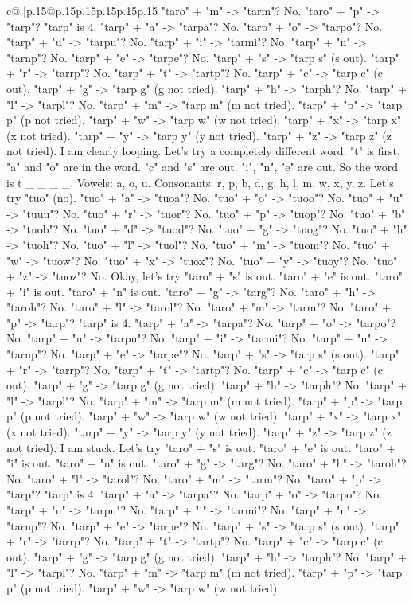 \documentclass{article}
\begin{document}
{\begin{supertabular}{c@{$\;$}|p{.15\linewidth}@{}p{.15\linewidth}p{.15\linewidth}p{.15\linewidth}p{.15\linewidth}p{.15\linewidth}}
{{{"taro" + "m" {-}> "tarm"? No. "taro" + "p" {-}> "tarp"? "tarp" is 4. "tarp" + "a" {-}> "tarpa"? No. "tarp" + "o" {-}> "tarpo"? No. "tarp" + "u" {-}> "tarpu"? No. "tarp" + "i" {-}> "tarmi"? No. "tarp" + "n" {-}> "tarnp"? No. "tarp" + "e" {-}> "tarpe"? No. "tarp" + "s" {-}> "tarp s" (s out). "tarp" + "r" {-}> "tarrp"? No. "tarp" + "t" {-}> "tartp"? No. "tarp" + "c" {-}> "tarp c" (c out). "tarp" + "g" {-}> "tarp g" (g not tried). "tarp" + "h" {-}> "tarph"? No. "tarp" + "l" {-}> "tarpl"? No. "tarp" + "m" {-}> "tarp m" (m not tried). "tarp" + "p" {-}> "tarp p" (p not tried). "tarp" + "w" {-}> "tarp w" (w not tried). "tarp" + "x" {-}> "tarp x" (x not tried). "tarp" + "y" {-}> "tarp y" (y not tried). "tarp" + "z" {-}> "tarp z" (z not tried). I am clearly looping. Let's try a completely different word. "t" is first. "a" and "o" are in the word. "c" and "s" are out. "i", "n", "e" are out. So the word is t \_ \_ \_ \_. Vowels: a, o, u. Consonants: r, p, b, d, g, h, l, m, w, x, y, z. Let's try "tuo" (no). "tuo" + "a" {-}> "tuoa"? No. "tuo" + "o" {-}> "tuoo"? No. "tuo" + "u" {-}> "tuuu"? No. "tuo" + "r" {-}> "tuor"? No. "tuo" + "p" {-}> "tuop"? No. "tuo" + "b" {-}> "tuob"? No. "tuo" + "d" {-}> "tuod"? No. "tuo" + "g" {-}> "tuog"? No. "tuo" + "h" {-}> "tuoh"? No. "tuo" + "l" {-}> "tuol"? No. "tuo" + "m" {-}> "tuom"? No. "tuo" + "w" {-}> "tuow"? No. "tuo" + "x" {-}> "tuox"? No. "tuo" + "y" {-}> "tuoy"? No. "tuo" + "z" {-}> "tuoz"? No. Okay, let's try "taro" + "s" is out. "taro" + "e" is out. "taro" + "i" is out. "taro" + "n" is out. "taro" + "g" {-}> "targ"? No. "taro" + "h" {-}> "taroh"? No. "taro" + "l" {-}> "tarol"? No. "taro" + "m" {-}> "tarm"? No. "taro" + "p" {-}> "tarp"? "tarp" is 4. "tarp" + "a" {-}> "tarpa"? No. "tarp" + "o" {-}> "tarpo"? No. "tarp" + "u" {-}> "tarpu"? No. "tarp" + "i" {-}> "tarmi"? No. "tarp" + "n" {-}> "tarnp"? No. "tarp" + "e" {-}> "tarpe"? No. "tarp" + "s" {-}> "tarp s" (s out). "tarp" + "r" {-}> "tarrp"? No. "tarp" + "t" {-}> "tartp"? No. "tarp" + "c" {-}> "tarp c" (c out). "tarp" + "g" {-}> "tarp g" (g not tried). "tarp" + "h" {-}> "tarph"? No. "tarp" + "l" {-}> "tarpl"? No. "tarp" + "m" {-}> "tarp m" (m not tried). "tarp" + "p" {-}> "tarp p" (p not tried). "tarp" + "w" {-}> "tarp w" (w not tried). "tarp" + "x" {-}> "tarp x" (x not tried). "tarp" + "y" {-}> "tarp y" (y not tried). "tarp" + "z" {-}> "tarp z" (z not tried). I am stuck. Let's try "taro" + "s" is out. "taro" + "e" is out. "taro" + "i" is out. "taro" + "n" is out. "taro" + "g" {-}> "targ"? No. "taro" + "h" {-}> "taroh"? No. "taro" + "l" {-}> "tarol"? No. "taro" + "m" {-}> "tarm"? No. "taro" + "p" {-}> "tarp"? "tarp" is 4. "tarp" + "a" {-}> "tarpa"? No. "tarp" + "o" {-}> "tarpo"? No. "tarp" + "u" {-}> "tarpu"? No. "tarp" + "i" {-}> "tarmi"? No. "tarp" + "n" {-}> "tarnp"? No. "tarp" + "e" {-}> "tarpe"? No. "tarp" + "s" {-}> "tarp s" (s out). "tarp" + "r" {-}> "tarrp"? No. "tarp" + "t" {-}> "tartp"? No. "tarp" + "c" {-}> "tarp c" (c out). "tarp" + "g" {-}> "tarp g" (g not tried). "tarp" + "h" {-}> "tarph"? No. "tarp" + "l" {-}> "tarpl"? No. "tarp" + "m" {-}> "tarp m" (m not tried). "tarp" + "p" {-}> "tarp p" (p not tried). "tarp" + "w" {-}> "tarp w" (w not tried). }}}
\end{supertabular}}
\end{document}
